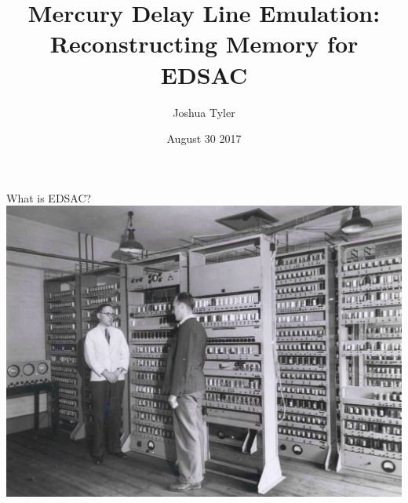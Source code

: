 \documentclass[aspectratio=169,11pt, xcolor={table}]{beamer}
\title{\huge Mercury Delay Line Emulation:\\Reconstructing Memory for EDSAC}
\date{August 30 2017}
\author{{\large Joshua Tyler}}
\begin{document}
\maketitle

\begin{frame}{What is EDSAC?}
	\centering
	\includegraphics[height=0.8\textheight]{figs/wilkes_renwick_edsac_crop}

\end{frame}
\end{document}
